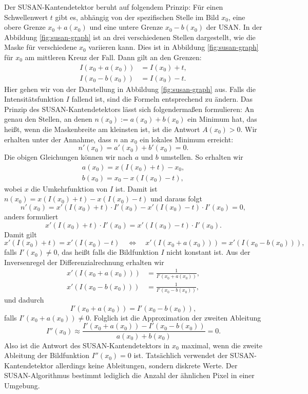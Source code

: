 \documentclass[a4paper, 11pt]{report}
\theoremstyle{definition}
\begin{document}
				Der SUSAN-Kantendetektor beruht auf folgendem Prinzip: Für einen Schwellenwert $t$ gibt es, abhängig von der spezifischen Stelle im Bild $x_0$, eine obere Grenze $x_0+a(x_0)$ und eine untere Grenze $x_0-b(x_0)$ der USAN. In der Abbildung \ref{fig:susan-graph} ist an drei verschiedenen Stellen dargestellt, wie die Maske für verschiedene $x_0$ variieren kann. Dies ist in Abbildung \ref{fig:susan-graph} für $x_0$ am mittleren Kreuz der Fall.
				Dann gilt an den Grenzen:
				\begin{align*}
					I(x_0 + a(x_0)) &= I(x_0) + t, \\
					I(x_0 - b(x_0)) &= I(x_0) - t.
				\end{align*}
				Hier gehen wir von der Darstellung in Abbildung \ref{fig:susan-graph} aus. Falls die Intensitätsfunktion $I$ fallend ist, sind die Formeln entsprechend zu ändern.
				Das Prinzip des SUSAN-Kantendetektors lässt sich folgendermaßen formulieren: An genau den Stellen, an denen $n(x_0) := a(x_0) + b(x_0)$ ein Minimum hat, das heißt, wenn die Maskenbreite am kleinsten ist, ist die Antwort $A(x_0) > 0$. Wir erhalten unter der Annahme, dass $n$ an $x_0$ ein lokales Minimum erreicht:
				$$ n'(x_0) = a'(x_0) + b'(x_0) = 0. $$
				Die obigen Gleichungen können wir nach $a$ und $b$ umstellen. So erhalten wir
				\begin{align*}
					a(x_0) = x(I(x_0) + t) - x_0, \\
					b(x_0) = x_0 - x(I(x_0) - t),
				\end{align*}
				wobei $x$ die Umkehrfunktion von $I$ ist.
				Damit ist $n(x_0) = x(I(x_0) + t) - x(I(x_0) - t)$ und daraus folgt
				$$ n'(x_0) = x'(I(x_0) + t) \cdot I'(x_0) - x'(I(x_0) - t) \cdot I'(x_0) = 0,$$
				anders formuliert
				$$ x'(I(x_0) + t) \cdot I'(x_0) = x'(I(x_0) - t) \cdot I'(x_0). $$
				Damit gilt
				$$
					x'(I(x_0) + t) = x'(I(x_0) - t) \quad \iff \quad x'(I(x_0 + a(x_0))) = x'(I(x_0 - b(x_0))),
				$$
				falls $I'(x_0) \neq 0$, das heißt falls die Bildfunktion $I$ nicht konstant ist.
	 			Aus der Inversenregel der Differenzialrechnung erhalten wir
	 			\begin{align*}
	 				x'(I(x_0 + a(x_0))) &= \frac{1}{I'(x_0 + a(x_0))},\\
	 				x'(I(x_0 - b(x_0))) &= \frac{1}{I'(x_0 - b(x_0))},
	 			\end{align*}
	 			und dadurch
	 			$$ I'(x_0 + a(x_0)) = I'(x_0 - b(x_0)), $$
	 			falls $I'(x_0 + a(x_0)) \neq 0$.
	 			Folglich ist die Approximation der zweiten Ableitung
	 			$$I''(x_0) \approx \frac{I'(x_0 + a(x_0)) - I'(x_0 - b(x_0))}{a(x_0) + b(x_0)} = 0.$$
	 			Also ist die Antwort des SUSAN-Kantendetektors in $x_0$ maximal, wenn die zweite Ableitung der Bildfunktion $I''(x_0) = 0$ ist. Tatsächlich verwendet der SUSAN-Kantendetektor allerdings keine Ableitungen, sondern diskrete Werte. Der SUSAN-Algorithmus bestimmt lediglich die Anzahl der ähnlichen Pixel in einer Umgebung.
\end{document}
